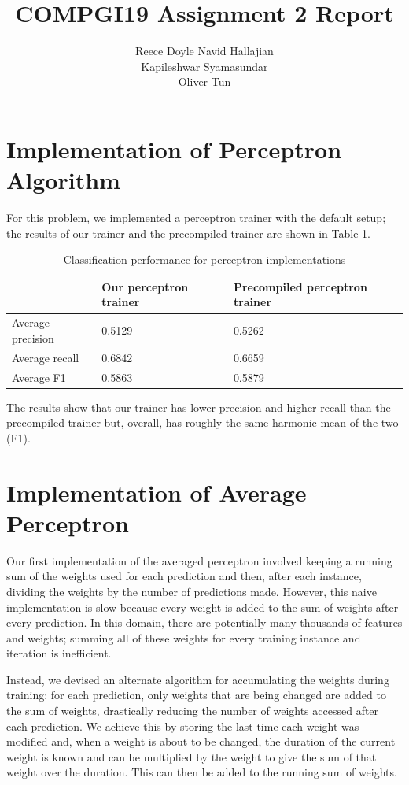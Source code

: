 \documentclass{article} %
\title{COMPGI19 Assignment 2 Report}
\author{
Reece Doyle
\And
Navid Hallajian \\
\And
Kapileshwar Syamasundar \\
\And
Oliver Tun \\
}
\begin{document}
\maketitle

\section{Implementation of Perceptron Algorithm}
For this problem, we implemented a perceptron trainer with the default setup; the results of our trainer and the precompiled trainer are shown in Table \ref{table:1_perf}.

\begin{table}[htb]
\centering
\caption{Classification performance for perceptron implementations}
\label{table:1_perf}
\begin{tabular}{l|l|l|}
\cline{2-3}
                                        & Our perceptron trainer & Precompiled perceptron trainer \\ \hline
\multicolumn{1}{|l|}{Average precision} & 0.5129     & 0.5262             \\ \hline
\multicolumn{1}{|l|}{Average recall}    & 0.6842     & 0.6659              \\ \hline
\multicolumn{1}{|l|}{Average F1}        & 0.5863     & 0.5879             \\ \hline
\end{tabular}
\end{table}

The results show that our trainer has lower precision and higher recall than the precompiled trainer but, overall, has roughly the same harmonic mean of the two (F1).
\section{Implementation of Average Perceptron}

Our first implementation of the averaged perceptron involved keeping a running sum of the weights used for each prediction and then, after each instance, dividing the weights by the number of predictions made. However, this naive implementation is slow because every weight is added to the sum of weights after every prediction. In this domain, there are potentially many thousands of features and weights; summing all of these weights for every training instance and iteration is inefficient.

Instead, we devised an alternate algorithm for accumulating the weights during training: for each prediction, only weights that are being changed are added to the sum of weights, drastically reducing the number of weights accessed after each prediction. We achieve this by storing the last time each weight was modified and, when a weight is about to be changed, the duration of the current weight is known and can be multiplied by the weight to give the sum of that weight over the duration. This can then be added to the running sum of weights.
\end{document}
